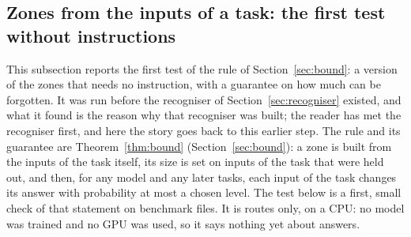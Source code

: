 \subsection{Zones from the inputs of a task: the first test without instructions}
\label{sec:noinstruction}

This subsection reports the first test of the rule of Section~\ref{sec:bound}: a version of the zones that needs no instruction, with a guarantee on how much can be forgotten. It was run before the recogniser of Section~\ref{sec:recogniser} existed, and what it found is the reason why that recogniser was built; the reader has met the recogniser first, and here the story goes back to this earlier step.
The rule and its guarantee are Theorem~\ref{thm:bound} (Section~\ref{sec:bound}): a zone is built from the inputs of the task itself, its size is set on inputs of the task that were held out, and then, for any model and any later tasks, each input of the task changes its answer with probability at most a chosen level.
The test below is a first, small check of that statement on benchmark files. It is routes only, on a CPU: no model was trained and no GPU was used, so it says nothing yet about answers.

